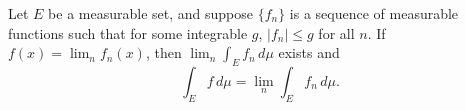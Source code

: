 Let $E$ be a measurable set, and suppose $\{f_n\}$ is a sequence of measurable functions such that for some integrable $g$, $|f_n| \leq g$ for all $n$. If $f(x) = \lim_n f_n(x)$, then $\lim_n \int_E f_n \, d\mu$ exists and
$$\int_E f \, d\mu = \lim_n \int_E f_n \, d\mu.$$
